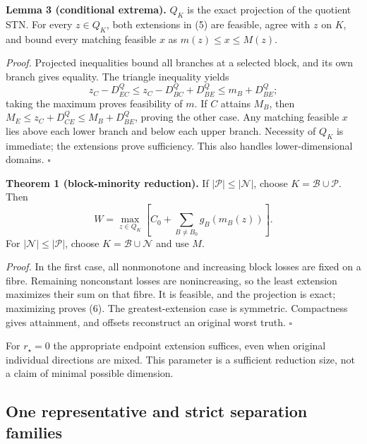 \noindent\textbf{Lemma 3 (conditional extrema).}
\(Q_K\) is the exact projection of the quotient STN.
For every \(z\in Q_K\), both extensions in (5) are feasible, agree
with \(z\) on \(K\), and bound every matching feasible \(x\) as
\(m(z)\le x\le M(z)\).

\noindent\emph{Proof.}
Projected inequalities bound all branches at a selected block, and
its own branch gives equality. The triangle inequality yields
\[
 z_C-D^Q_{EC}\le z_C-D^Q_{BC}+D^Q_{BE}
                   \le m_B+D^Q_{BE};
\]
taking the maximum proves feasibility of \(m\).
If \(C\) attains \(M_B\), then
\(M_E\le z_C+D^Q_{CE}\le M_B+D^Q_{BE}\), proving the other case.
Any matching feasible \(x\) lies above each lower branch and below
each upper branch. Necessity of \(Q_K\) is immediate; the extensions
prove sufficiency. This also handles lower-dimensional domains.
\(\square\)

\noindent\textbf{Theorem 1 (block-minority reduction).}
If \(|\mathcal P|\le|\mathcal N|\), choose
\(K=\mathcal B\cup\mathcal P\). Then
\[
 W=\max_{z\in Q_K}\left[C_0+
                  \sum_{B\ne B_0}g_B(m_B(z))\right].              \tag{6}
\]
For \(|\mathcal N|\le|\mathcal P|\), choose
\(K=\mathcal B\cup\mathcal N\) and use \(M\).

\noindent\emph{Proof.}
In the first case, all nonmonotone and increasing block losses are
fixed on a fibre. Remaining nonconstant losses are nonincreasing,
so the least extension maximizes their sum on that fibre.
It is feasible, and the projection is exact; maximizing proves
(6). The greatest-extension case is symmetric. Compactness gives
attainment, and offsets reconstruct an original worst truth.
\(\square\)

For \(r_\star=0\) the appropriate endpoint extension suffices,
even when original individual directions are mixed.
This parameter is a sufficient reduction size, not a claim of
minimal possible dimension.

\subsection{One representative and strict separation families}

